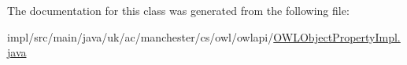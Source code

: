 The documentation for this class was generated from the following file\-:\begin{DoxyCompactItemize}
\item 
impl/src/main/java/uk/ac/manchester/cs/owl/owlapi/\hyperlink{_o_w_l_object_property_impl_8java}{O\-W\-L\-Object\-Property\-Impl.\-java}\end{DoxyCompactItemize}
